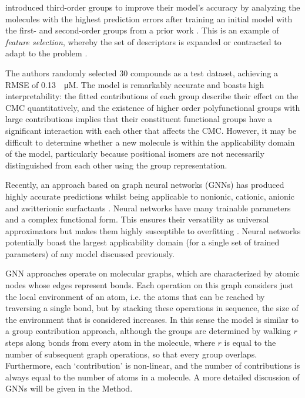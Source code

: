 \citet{matteiModelingCriticalMicelle2013} introduced third-order groups to
improve their model's accuracy by analyzing the molecules with the highest
prediction errors after training an initial model with the first- and
second-order groups from a prior work \cite{ganiAutomaticCreationMissing2005}.
This is an example of \emph{feature selection}, whereby the set of descriptors
is expanded or contracted to adapt to the problem
\cite{liFeatureSelectionData2017,guyonIntroductionVariableFeature2003}.

The authors randomly selected 30 compounds as a test dataset, achieving a RMSE
of \SI{0.13}{\log \micro M}. The model is remarkably accurate and boasts high
interpretability: the fitted contributions of each group describe their effect
on the CMC quantitatively, and the existence of higher order polyfunctional
groups with large contributions implies that their constituent functional groups
have a significant interaction with each other that affects the CMC. However, it
may be difficult to determine whether a new molecule is within the applicability
domain of the model, particularly because positional isomers are not necessarily
distinguished from each other using the group representation.

Recently, an approach based on graph neural networks (GNNs) has produced highly
accurate predictions whilst being applicable to nonionic, cationic, anionic and
zwitterionic surfactants \cite{qinPredictingCriticalMicelle2021}. Neural
networks have many trainable parameters and a complex functional form. This
ensures their versatility as universal approximators but makes them highly
susceptible to overfitting \cite{bejaniSystematicReviewOverfitting2021}. Neural
networks potentially boast the largest applicability domain (for a single set of
trained parameters) of any model discussed previously.

GNN approaches operate on molecular graphs, which are characterized by atomic
nodes whose edges represent bonds. Each operation on this graph considers just
the local environment of an atom, i.e. the atoms that can be reached by
traversing a single bond, but by stacking these operations in sequence, the size
of the environment that is considered increases. In this sense the model is
similar to a group contribution approach, although the groups are determined by
walking $r$ steps along bonds from every atom in the molecule, where $r$ is
equal to the number of subsequent graph operations, so that every group
overlaps. Furthermore, each `contribution' is non-linear, and the number of
contributions is always equal to the number of atoms in a molecule. A more
detailed discussion of GNNs will be given in the Method.